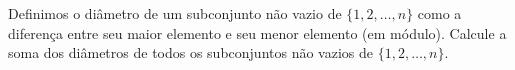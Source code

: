 Definimos o diâmetro de um subconjunto não vazio de $\{1, 2,\dots , n\}$ como a diferença entre seu maior elemento e seu menor elemento (em módulo).
Calcule a soma dos diâmetros de todos os subconjuntos não vazios de $\{1, 2,\dots , n\}$.
